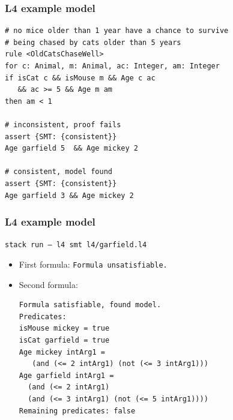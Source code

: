 \documentclass{beamer}
\begin{document}
\begin{frame}[fragile]\frametitle{L4 example model}


\begin{verbatim}
# no mice older than 1 year have a chance to survive 
# being chased by cats older than 5 years
rule <OldCatsChaseWell>
for c: Animal, m: Animal, ac: Integer, am: Integer
if isCat c && isMouse m && Age c ac 
   && ac >= 5 && Age m am 
then am < 1

# inconsistent, proof fails
assert {SMT: {consistent}}
Age garfield 5  && Age mickey 2

# consistent, model found
assert {SMT: {consistent}} 
Age garfield 3 && Age mickey 2

\end{verbatim}

\end{frame}



\begin{frame}[fragile]\frametitle{L4 example model}

\texttt{stack run -- l4 smt l4/garfield.l4}

\begin{itemize}
\item First formula: \texttt{Formula unsatisfiable.}
\item Second formula:
\begin{verbatim}
Formula satisfiable, found model.
Predicates: 
isMouse mickey = true
isCat garfield = true
Age mickey intArg1 = 
   (and (<= 2 intArg1) (not (<= 3 intArg1)))
Age garfield intArg1 = 
  (and (<= 2 intArg1) 
  (and (<= 3 intArg1) (not (<= 5 intArg1))))
Remaining predicates: false
\end{verbatim}
\end{itemize}

\end{frame}

\end{document}
